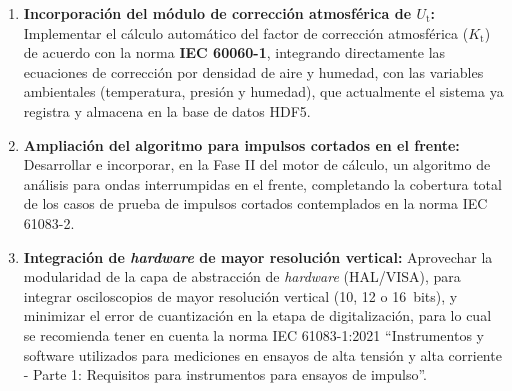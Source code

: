 \begin{enumerate}
    \item \textbf{Incorporación del módulo de corrección atmosférica de $U_\text{t}$:}
    Implementar el cálculo automático del factor de corrección atmosférica ($K_\text{t}$) de acuerdo con la norma \textbf{IEC 60060-1}, integrando directamente las ecuaciones de corrección por densidad de aire y humedad, con las variables ambientales (temperatura, presión y humedad), que actualmente el sistema ya registra y almacena en la base de datos HDF5.

    \item \textbf{Ampliación del algoritmo para impulsos cortados en el frente:}
    Desarrollar e incorporar, en la Fase II del motor de cálculo, un algoritmo de análisis para ondas interrumpidas en el frente, completando la cobertura total de los casos de prueba de impulsos cortados contemplados en la norma IEC 61083-2.

    \item \textbf{Integración de \emph{hardware} de mayor resolución vertical:}
    Aprovechar la modularidad de la capa de abstracción de \emph{hardware} (HAL/VISA), para integrar osciloscopios de mayor resolución vertical (\num{10}, \num{12} o \qty{16}{bits}), y minimizar el error de cuantización en la etapa de digitalización, para lo cual se recomienda tener en cuenta la norma IEC 61083-1:2021 \enquote{Instrumentos y software utilizados para mediciones en ensayos de alta tensión y alta corriente - Parte 1: Requisitos para instrumentos para ensayos de impulso}.
\end{enumerate}